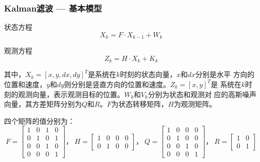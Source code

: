 \documentclass[xcolor=svgnames,serif,table,10pt]{beamer}
\begin{document}
\begin{frame}[allowframebreaks]
  \frametitle{Kalman滤波 --- 基本模型}
  \begin{block}{状态方程}
    \begin{equation}
    \label{eq:state}
    X_{k}=F\cdot X_{k-1}+W_k
  \end{equation}
\end{block}

\begin{block}{观测方程}
  \begin{equation}
    \label{eq:observation}
    Z_{k}=H\cdot X_{k}+K_{k}
  \end{equation}  
\end{block}

其中，$X_k = [x,y,dx,dy]^{T}$是系统在$k$时刻的状态向量，$x$和$dx$分别是水平
方向的位置和速度，$y$和$dy$则分别是竖直方向的位置和速度。$Z_k=[x,y]^{T}$是
系统在$k$时刻的观测向量，表示观测目标的位置。$W_k$和$V_k$分别为状态和观测对
应的高斯噪声向量，其方差矩阵分别为$Q$和$R$。$F$为状态转移矩阵，$H$为观测矩阵。

四个矩阵的值分别为\cite{Zhang2009}：$$F=\begin{bmatrix}
  1 & 0 & 1 & 0\\0 & 1 & 0 & 1 \\ 0 & 0 & 1 & 0\\ 0 & 0 & 0 & 1
\end{bmatrix}
\mbox{，}~
H = \begin{bmatrix}
  1 & 0 & 0 & 0\\0 & 1 & 0 & 0
\end{bmatrix}
\mbox{，}~
Q=\begin{bmatrix}
  1 & 0 & 0 & 0\\0 & 1 & 0 & 0 \\ 0 & 0 & 1 & 0\\ 0 & 0 & 0 & 1
\end{bmatrix}
\mbox{，}~
R = \begin{bmatrix}
  1 & 0 \\0 & 1 
\end{bmatrix}
$$
\end{frame}
\end{document}
